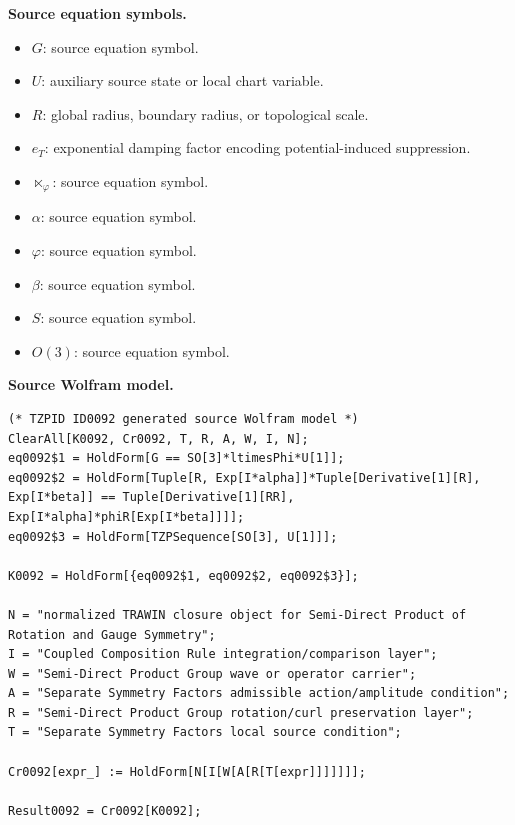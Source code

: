 \begin{minipage}[t]{0.49\linewidth}
\begingroup
\small
\raggedright
\textbf{Source equation symbols.}\par
\begin{itemize}[leftmargin=1.35em,itemsep=1pt,topsep=1pt,parsep=0pt]
    \item $G$: source equation symbol.
    \item $U$: auxiliary source state or local chart variable.
    \item $R$: global radius, boundary radius, or topological scale.
    \item $e_T$: exponential damping factor encoding potential-induced suppression.
    \item $\ltimes_{\varphi}$: source equation symbol.
    \item $\alpha$: source equation symbol.
    \item $\varphi$: source equation symbol.
    \item $\beta$: source equation symbol.
    \item $S$: source equation symbol.
    \item $O(3)$: source equation symbol.
\end{itemize}
\endgroup
\end{minipage}\hfill
\begin{minipage}[t]{0.47\linewidth}
\begingroup
\scriptsize
\raggedright
\textbf{Source Wolfram model.}\par
\begin{Verbatim}[fontsize=\tiny,breaklines=true,breakanywhere=true]
(* TZPID ID0092 generated source Wolfram model *)
ClearAll[K0092, Cr0092, T, R, A, W, I, N];
eq0092$1 = HoldForm[G == SO[3]*ltimesPhi*U[1]];
eq0092$2 = HoldForm[Tuple[R, Exp[I*alpha]]*Tuple[Derivative[1][R], Exp[I*beta]] == Tuple[Derivative[1][RR], Exp[I*alpha]*phiR[Exp[I*beta]]]];
eq0092$3 = HoldForm[TZPSequence[SO[3], U[1]]];

K0092 = HoldForm[{eq0092$1, eq0092$2, eq0092$3}];

N = "normalized TRAWIN closure object for Semi-Direct Product of Rotation and Gauge Symmetry";
I = "Coupled Composition Rule integration/comparison layer";
W = "Semi-Direct Product Group wave or operator carrier";
A = "Separate Symmetry Factors admissible action/amplitude condition";
R = "Semi-Direct Product Group rotation/curl preservation layer";
T = "Separate Symmetry Factors local source condition";

Cr0092[expr_] := HoldForm[N[I[W[A[R[T[expr]]]]]]];

Result0092 = Cr0092[K0092];
\end{Verbatim}
\endgroup
\end{minipage}

